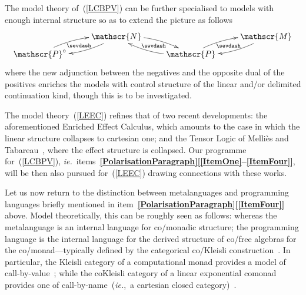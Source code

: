 \documentclass[11pt,twocolumn]{article}
\newcommand{\itemref}[1]{\textbf{[\ref{#1}]}}
\newcommand{\ie}{\emph{ie.}}
\newcommand{\cat}[1]{\mathscr{#1}}
\newcommand{\op}{\circ}
\begin{document}
The model theory of~(\ref{LCBPV}) can be further specialised to
models with enough internal structure so as to extend the picture as
follows
\begin{equation}\label{LEEC}
  \begin{minipage}{\columnwidth}
  \xymatrix@R=5pt{
    & \ar@/^.75em/[dl] \ar@{}[dl]|-\sevdash \cat N \ar@/^.75em/[dr] &
    \ar@{}[rd]|-{\sevdash} \ar@{}[dl]|-{\swvdash} & \ar@/^.75em/[dl] \cat
    M \\
    \ar@/^.75em/[ur] \cat P^\op & & \ar@/^.75em/[lu] \cat P \ar@/^.75em/[ur] & 
  }\end{minipage}
\end{equation}
where the new adjunction between the negatives and the opposite dual of
the positives enriches the models with control structure of the
linear %
and/or delimited continuation %
kind, though this is to be investigated.

The model theory~(\ref{LEEC}) refines that of two recent developments: the
aforementioned Enriched Effect Calculus, which amounts to the case in
which the linear structure collapses to cartesian one; and the Tensor
Logic of Melli\`es and Tabareau~\cite{TensorLogic}, where the effect
structure is collapsed.  Our programme for~(\ref{LCBPV}),
\ie~items~\mbox{\textbf{\ref{PolarisationParagraph}}\thinspace\textbf{[\ref{ItemOne}--\ref{ItemFour}]}},
will be then also pursued for~(\ref{LEEC}) drawing connections with these
works.

Let us now return to the distinction between metalanguages and programming
languages briefly mentioned in
item~\textbf{\ref{PolarisationParagraph}}\thinspace\itemref{ItemFour} above.
Model theoretically, this can be roughly seen as follows: whereas the
metalanguage is an internal language for co/monadic structure; the programming
language is the internal language for the derived structure of co/free
algebras for the co/monad---typically defined by the categorical co/Kleisli
construction~\cite{MacLane}.  In particular, the Kleisli category of a
computational monad provides a model of call-by-value~\cite{MoggiLambdaC};
while the coKleisli category of a linear exponential comonad provides one
of call-by-name~(\ie,~a cartesian closed category)~\cite{Seely}.
\end{document}

